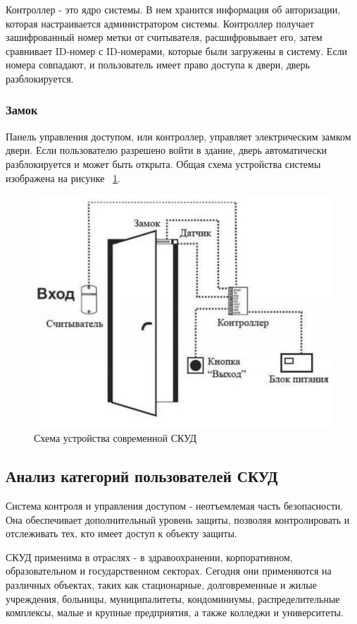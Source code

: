Контроллер - это ядро системы. В нем хранится информация об авторизации, которая настраивается администратором системы. Контроллер получает зашифрованный номер метки от считывателя, расшифровывает его, затем сравнивает ID-номер с ID-номерами, которые были загружены в систему. Если номера совпадают, и пользователь имеет право доступа к двери, дверь разблокируется.

\subsubsection {Замок}

Панель управления доступом, или контроллер, управляет электрическим замком двери. Если пользователю разрешено войти в здание, дверь автоматически разблокируется и может быть открыта.
Общая схема устройства системы изображена на рисунке ~\ref{fig:commonscheme1}.
\begin{figure}
	\centering
	\includegraphics[width=0.7\linewidth]{images/CommonScheme1}
	\caption{Схема устройства современной СКУД}
	\label{fig:commonscheme1}
\end{figure}

\subsection{Анализ категорий пользователей СКУД}

Система контроля и управления доступом - неотъемлемая часть безопасности. Она обеспечивает дополнительный уровень защиты, позволяя контролировать и отслеживать тех, кто имеет доступ к объекту защиты.

СКУД применима в отраслях - в здравоохранении, корпоративном, образовательном и государственном секторах. Сегодня они применяются на различных объектах, таких как стационарные, долговременные и жилые учреждения, больницы, муниципалитеты, кондоминиумы, распределительные комплексы, малые и крупные предприятия, а также колледжи и университеты.

